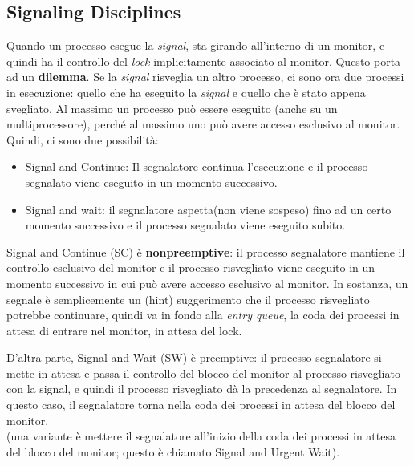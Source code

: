 \documentclass[10pt,a4paper]{book}
\begin{document}
\subsection{Signaling Disciplines}
Quando un processo esegue la \textit{signal}, sta girando all'interno di un monitor, e quindi ha il controllo del \textit{lock} implicitamente associato al monitor. Questo porta ad un \textbf{dilemma}. Se la \textit{signal} risveglia un altro processo, ci sono ora due processi in esecuzione: quello che ha eseguito la \textit{signal} e quello che è stato appena svegliato. Al massimo un processo può essere eseguito (anche su un multiprocessore), perché al massimo uno può avere accesso esclusivo al monitor. Quindi, ci sono due possibilità:
\begin{itemize}
\item Signal and Continue: Il segnalatore continua l'esecuzione e il processo segnalato viene eseguito in un momento successivo.
\item Signal and wait: il segnalatore aspetta(non viene sospeso) fino ad un certo momento successivo e il processo segnalato viene eseguito subito.
\end{itemize}

Signal and Continue (SC) è \textbf{nonpreemptive}: il processo segnalatore mantiene il controllo esclusivo del monitor e il processo risvegliato viene eseguito in un momento successivo in cui può avere accesso esclusivo al monitor. In sostanza, un segnale è semplicemente un (hint) suggerimento che il processo risvegliato potrebbe continuare, quindi va in fondo alla \textit{entry queue}, la coda dei processi in attesa di entrare nel monitor, in attesa del lock.

D'altra parte, Signal and Wait (SW) è preemptive: il processo segnalatore si mette in attesa e passa il controllo del blocco del monitor al processo risvegliato con la signal, e quindi il processo risvegliato dà la precedenza al segnalatore. In questo caso, il segnalatore torna nella coda dei processi in attesa del blocco del monitor.\\ (una variante è mettere il segnalatore all'inizio della coda dei processi in attesa del blocco del monitor; questo è chiamato Signal and Urgent Wait).\\ \\ 
\end{document}
